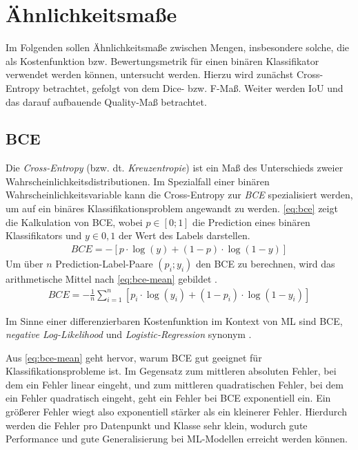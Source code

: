 \section{Ähnlichkeitsmaße}

Im Folgenden sollen Ähnlichkeitsmaße zwischen Mengen, insbesondere 
solche, die als Kostenfunktion bzw. Bewertungsmetrik für einen binären 
Klassifikator verwendet werden können, untersucht werden. Hierzu wird zunächst Cross-Entropy betrachtet,
gefolgt von dem Dice- bzw. F-Maß. Weiter werden \ac{IoU} und das darauf aufbauende Quality-Maß betrachtet.

\subsection{\acf{BCE}}

Die \textit{Cross-Entropy} (bzw. dt. \textit{Kreuzentropie}) ist ein Maß des Unterschieds zweier
Wahrscheinlichkeitsdistributionen. Im Spezialfall einer binären Wahrscheinlichkeitsvariable 
kann die Cross-Entropy zur \textit{\acf{BCE}} spezialisiert werden, um auf ein binäres 
Klassifikationsproblem angewandt zu werden. 
\autoref{eq:bce} zeigt die Kalkulation von \ac{BCE}, wobei $p \in [0;1]$ die Prediction 
eines binären Klassifikators und $y \in {0,1}$ der Wert des Labels darstellen.
\begin{align}
	\label{eq:bce} BCE = -[p \cdot \log(y) + (1-p) \cdot \log(1-y) ]
\end{align} 
Um über $n$ Prediction-Label-Paare $(p_i; y_i)$ den \ac{BCE} zu berechnen, wird das arithmetische Mittel nach
\autoref{eq:bce-mean} gebildet \cites[S.~82]{Cybenko.1999}[S.~57--59]{Murphy.2012}.
\begin{align}
	\label{eq:bce-mean} BCE = -\frac{1}{n}\sum_{i = 1}^{n}[p_i \cdot \log(y_i) + (1-p_i) \cdot \log(1-y_i) ]
\end{align}

Im Sinne einer differenzierbaren Kostenfunktion im Kontext von \ac{ML} sind \ac{BCE},
\textit{negative Log-Likelihood} und \textit{Logistic-Regression} synonym \cite[S.~249]{Murphy.2012}. 

Aus \autoref{eq:bce-mean} geht hervor, warum \ac{BCE} gut geeignet für Klassifikationsprobleme ist.
Im Gegensatz zum mittleren absoluten Fehler, bei dem ein Fehler linear eingeht, und zum mittleren quadratischen Fehler,
bei dem ein Fehler quadratisch eingeht, geht ein Fehler bei \ac{BCE} exponentiell ein. 
Ein größerer Fehler wiegt also exponentiell stärker als ein kleinerer Fehler. 
Hierdurch werden die Fehler pro Datenpunkt und Klasse sehr klein, 
wodurch gute Performance und gute Generalisierung bei \ac{ML}-Modellen erreicht werden können. \\

